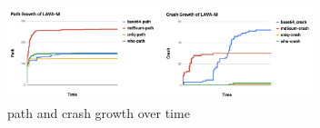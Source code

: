 %
%
%    
%        
%    


\begin{figure}[t]
    \centering
    \includegraphics[width=3.5in]{pic/insight11.png}
    \caption{path and crash growth over time}
    \label{path-crash-growth}
\end{figure}

